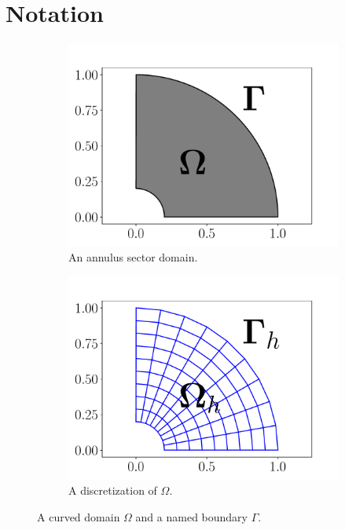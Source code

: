 \section{Notation}%
\label{sec:notation}
\begin{figure}
  \begin{subfigure}{.5\textwidth}
    \includegraphics[width=\textwidth]{images/domain.pdf}%
    \caption{An annulus sector domain.}%
    \label{fig:domain}
  \end{subfigure}
  \begin{subfigure}{.5\textwidth}
    \includegraphics[width=\textwidth]{images/grid.pdf}%
    \caption{A discretization of $\Omega$.}%
    \label{fig:grid}
  \end{subfigure}
  \caption{A curved domain $\Omega$ and a named boundary $\Gamma$.}
\end{figure}

